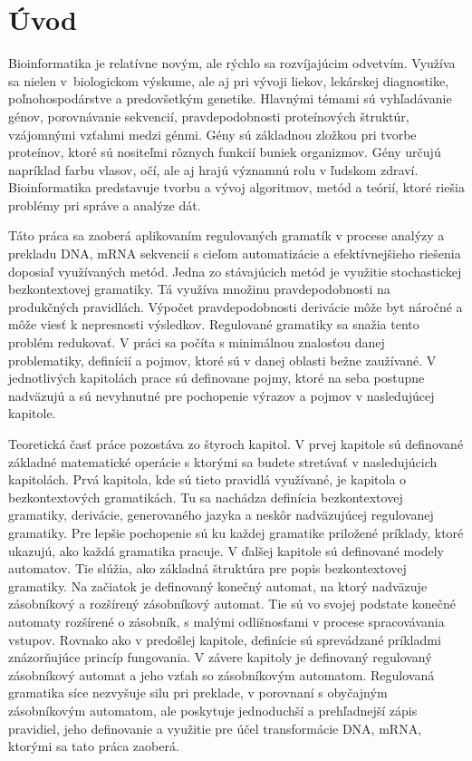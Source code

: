 
\chapter{Úvod}
\label{uvod}

Bioinformatika je relatívne novým, ale rýchlo sa rozvíjajúcim odvetvím. Využíva sa nielen v~biologickom výskume, ale aj pri vývoji liekov, lekárskej diagnostike, poľnohospodárstve a predovšetkým genetike. Hlavnými témami sú vyhľadávanie génov, porovnávanie sekvencií, pravdepodobnosti proteínových štruktúr, vzájomnými vzťahmi medzi génmi. Gény sú základnou zložkou pri tvorbe proteínov, ktoré sú nositeľmi rôznych funkcií buniek organizmov. Gény určujú napríklad farbu vlasov, očí, ale aj hrajú významnú rolu v ľudskom zdraví. Bioinformatika predstavuje tvorbu a vývoj algoritmov, metód a teórií, ktoré riešia problémy pri správe a analýze dát. 

Táto práca sa zaoberá aplikovaním regulovaných gramatík v procese analýzy a prekladu DNA, mRNA sekvencií s cieľom automatizácie a efektívnejšieho riešenia doposiaľ využívaných metód. Jedna zo stávajúcich metód je využitie stochastickej bezkontextovej gramatiky. Tá využíva množinu pravdepodobnosti na produkčných pravidlách. Výpočet pravdepodobnosti derivácie môže byt náročné a môže viesť k nepresnosti výsledkov. Regulované gramatiky sa snažia tento problém redukovať. V práci sa počíta s minimálnou znalosťou danej problematiky, definícií a pojmov, ktoré sú v danej oblasti bežne zaužívané. V jednotlivých kapitolách prace sú definovane pojmy, ktoré na seba postupne nadväzujú a sú nevyhnutné pre pochopenie výrazov a pojmov v nasledujúcej kapitole. 

Teoretická časť práce pozostáva zo štyroch kapitol. V prvej kapitole sú definované základné matematické operácie s ktorými sa budete stretávať v nasledujúcich kapitolách. Prvá kapitola, kde sú tieto pravidlá využívané, je kapitola o bezkontextových gramatikách. Tu sa nachádza definícia bezkontextovej gramatiky, derivácie, generovaného jazyka a neskôr nadväzujúcej regulovanej gramatiky. Pre lepšie pochopenie sú ku každej gramatike priložené príklady, ktoré ukazujú, ako každá gramatika pracuje. V ďalšej kapitole sú definované modely automatov. Tie slúžia, ako základná štruktúra pre popis bezkontextovej gramatiky. Na začiatok je definovaný konečný automat, na ktorý nadväzuje zásobníkový a rozšírený zásobníkový automat. Tie sú vo svojej podstate konečné automaty rozšírené o zásobník, s malými odlišnosťami v procese spracovávania vstupov. Rovnako ako v predošlej kapitole, definície sú sprevádzané príkladmi znázorňujúce princíp fungovania. V závere kapitoly je definovaný regulovaný zásobníkový automat a jeho vzťah so zásobníkovým automatom. Regulovaná gramatika síce nezvyšuje silu pri preklade, v porovnaní s obyčajným zásobníkovým automatom, ale poskytuje jednoduchší a prehľadnejší zápis pravidiel, jeho definovanie a využitie pre účel transformácie DNA, mRNA, ktorými sa tato práca zaoberá. 

